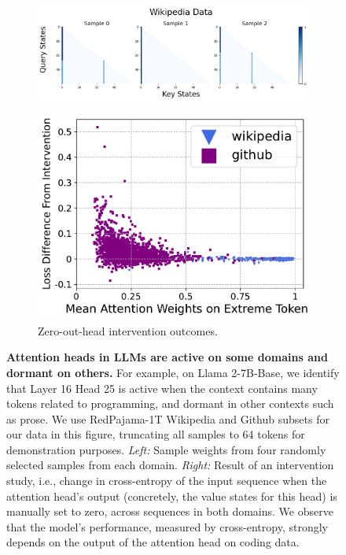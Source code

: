 \begin{figure}
\begin{subfigure}[t]{0.5\textwidth}
        \includegraphics[width=\textwidth]{Figures/L16_H25/attn_weights_l16h25_wikipedia_revised.png}
        \label{fig:github_wikipedia_weights}
    \end{subfigure}
    \hfill
    \begin{subfigure}[t]{0.44\textwidth}
        \caption{\small Zero-out-head intervention outcomes.}
        \label{fig:github_wikipedia_zero_out}
        \includegraphics[width=\textwidth]{Figures/BBM/LLM_interventions.pdf}
    \end{subfigure}
    \vspace{-1.5em}
    \caption{\small \textbf{Attention heads in LLMs are active on some domains and dormant on others.} For example, on Llama 2-7B-Base, we identify that Layer 16 Head 25 is active when the context contains many tokens related to programming, and dormant in other contexts such as prose. We use RedPajama-1T \citep{together2023redpajama} Wikipedia and Github subsets for our data in this figure, truncating all samples to 64 tokens for demonstration purposes. \textit{Left:} Sample weights from four randomly selected samples from each domain. \textit{Right:} Result of an intervention study, i.e., change in cross-entropy of the input sequence when the attention head's output (concretely, the value states for this head) is manually set to zero, across sequences in both domains. We observe that the model's performance, measured by cross-entropy, strongly depends on the output of the attention head on coding data.
}
\end{figure}

